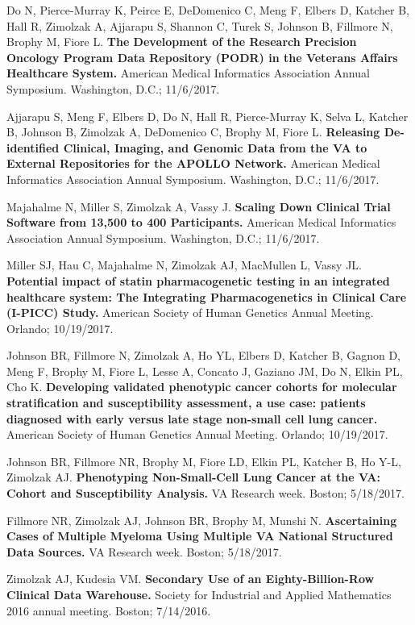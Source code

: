 \documentclass[10pt]{article}
\begin{document}
Do N, Pierce-Murray K, Peirce E, DeDomenico C, Meng F, Elbers D,
Katcher B, Hall R, Zimolzak A, Ajjarapu S, Shannon C, Turek S, Johnson
B, Fillmore N, Brophy M, Fiore L. \textbf{The Development of the
  Research Precision Oncology Program Data Repository (PODR) in the
  Veterans Affairs Healthcare System.} American Medical Informatics
Association Annual Symposium. Washington, D.C.; 11/6/2017.

Ajjarapu S, Meng F, Elbers D, Do N, Hall R, Pierce-Murray K, Selva L,
Katcher B, Johnson B, Zimolzak A, DeDomenico C, Brophy M, Fiore L.
\textbf{Releasing De-identified Clinical, Imaging, and Genomic Data
  from the VA to External Repositories for the APOLLO Network.}
American Medical Informatics Association Annual Symposium. Washington,
D.C.; 11/6/2017.

Majahalme N, Miller S, Zimolzak A, Vassy J. \textbf{Scaling Down
  Clinical Trial Software from 13,500 to 400 Participants.} American
Medical Informatics Association Annual Symposium. Washington, D.C.;
11/6/2017.

Miller SJ, Hau C, Majahalme N, Zimolzak AJ, MacMullen L, Vassy JL.
\textbf{Potential impact of statin pharmacogenetic testing in an
  integrated healthcare system: The Integrating Pharmacogenetics in
  Clinical Care (I-PICC) Study.} American Society of Human Genetics
Annual Meeting. Orlando; 10/19/2017.

Johnson BR, Fillmore N, Zimolzak A, Ho YL, Elbers D, Katcher B, Gagnon
D, Meng F, Brophy M, Fiore L, Lesse A, Concato J, Gaziano JM, Do N,
Elkin PL, Cho K. \textbf{Developing validated phenotypic cancer
  cohorts for molecular stratification and susceptibility assessment,
  a use case: patients diagnosed with early versus late stage
  non-small cell lung cancer.} American Society of Human Genetics
Annual Meeting. Orlando; 10/19/2017.

Johnson BR, Fillmore NR, Brophy M, Fiore LD, Elkin PL, Katcher B, Ho
Y-L, Zimolzak AJ. \textbf{Phenotyping Non-Small-Cell Lung Cancer at
  the VA: Cohort and Susceptibility Analysis.} VA Research week.
Boston; 5/18/2017.

Fillmore NR, Zimolzak AJ, Johnson BR, Brophy M, Munshi N.
\textbf{Ascertaining Cases of Multiple Myeloma Using Multiple VA
  National Structured Data Sources.} VA Research week. Boston;
5/18/2017.

Zimolzak AJ, Kudesia VM. \textbf{Secondary Use of an
  Eighty-Billion-Row Clinical Data Warehouse.} Society for Industrial
and Applied Mathematics 2016 annual meeting. Boston; 7/14/2016.
\end{document}
